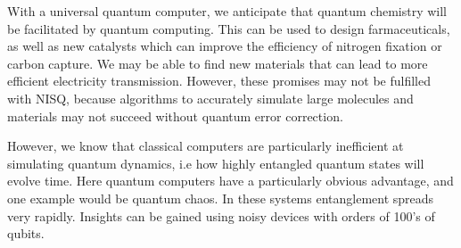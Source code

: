 With a universal quantum computer, we anticipate that quantum chemistry will be facilitated by quantum computing. This can be used to design farmaceuticals, as well as new catalysts which can improve the efficiency of nitrogen fixation or carbon capture. We may be able to find new materials that can lead to more efficient electricity transmission. However, these promises may not be fulfilled with NISQ, because algorithms to accurately simulate large molecules and materials may not succeed without quantum error correction.

However, we know that classical computers are particularly inefficient at simulating quantum dynamics, i.e how highly entangled quantum states will evolve time. Here quantum computers have a particularly obvious advantage, and one example would be quantum chaos. In these systems entanglement spreads very rapidly. Insights can be gained using noisy devices with orders of 100's of qubits.

